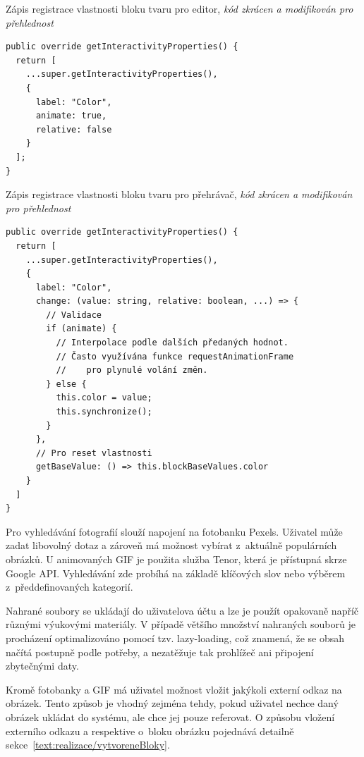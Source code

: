\begin{listing}[ht!]
\caption[Zápis registrace vlastnosti bloku tvaru pro editor]{Zápis registrace vlastnosti bloku tvaru pro editor, \textit{kód zkrácen a modifikován pro přehlednost}}\label{code:zapisVlastnostiEditor}
\begin{verbatim}
public override getInteractivityProperties() {
  return [
    ...super.getInteractivityProperties(),
    {
      label: "Color",
      animate: true,
      relative: false
    }
  ];
}
\end{verbatim}
\end{listing}



\begin{listing}[ht!]
\caption[Zápis registrace vlastnosti bloku tvaru pro přehrávač]{Zápis registrace vlastnosti bloku tvaru pro přehrávač, \textit{kód zkrácen a modifikován pro přehlednost}}\label{code:zapisVlastnostiPrehravac}
\begin{verbatim}
public override getInteractivityProperties() {
  return [
    ...super.getInteractivityProperties(),
    {
      label: "Color",
      change: (value: string, relative: boolean, ...) => {
        // Validace
        if (animate) {
          // Interpolace podle dalších předaných hodnot.
          // Často využívána funkce requestAnimationFrame
          //    pro plynulé volání změn.
        } else {
          this.color = value;
          this.synchronize();
        }
      },
      // Pro reset vlastnosti
      getBaseValue: () => this.blockBaseValues.color
    }
  ]
}
\end{verbatim}
\end{listing}

Pro vyhledávání fotografií slouží napojení na fotobanku Pexels. 
Uživatel může zadat libovolný dotaz a zároveň má možnost vybírat z~aktuálně populárních obrázků. 
U animovaných GIF je použita služba Tenor, která je přístupná skrze Google API. 
Vyhledávání zde probíhá na základě klíčových slov nebo výběrem z~předdefinovaných kategorií.

Nahrané soubory se ukládají do uživatelova účtu a lze je použít opakovaně napříč různými výukovými materiály.
V případě většího množství nahraných souborů je procházení optimalizováno pomocí tzv. lazy-loading, což znamená, že se obsah načítá postupně podle potřeby, a nezatěžuje tak prohlížeč ani připojení zbytečnými daty.

Kromě fotobanky a GIF má uživatel možnost vložit jakýkoli externí odkaz na obrázek.
Tento způsob je vhodný zejména tehdy, pokud uživatel nechce daný obrázek ukládat do systému, ale chce jej pouze referovat. 
O způsobu vložení externího odkazu a respektive o~bloku obrázku pojednává detailně sekce~\ref{text:realizace/vytvoreneBloky}.


